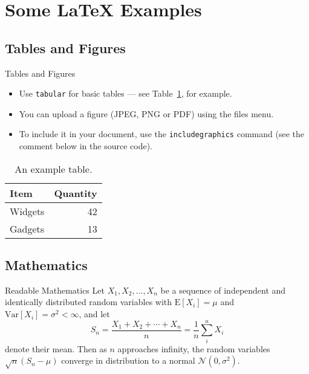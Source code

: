 \documentclass[10pt]{beamer}
\begin{document}
\section{Some \LaTeX{} Examples}

\subsection{Tables and Figures}
\begin{frame}{Tables and Figures}
  \begin{itemize}
    \item Use \texttt{tabular} for basic tables --- see Table~\ref{tab:widgets}, for example.
    \item You can upload a figure (JPEG, PNG or PDF) using the files menu.
    \item To include it in your document, use the \texttt{includegraphics} command (see the comment below in the source code).
  \end{itemize}


  \begin{table}
    \centering
    \begin{tabular}{l|r}
    Item & Quantity \\\hline
    Widgets & 42 \\
    Gadgets & 13
    \end{tabular}
    \caption{\label{tab:widgets}An example table.}
  \end{table}
\end{frame}

\subsection{Mathematics}
\begin{frame}{Readable Mathematics}
  Let $X_1, X_2, \ldots, X_n$ be a sequence of independent and identically distributed random variables with $\text{E}[X_i] = \mu$ and $\text{Var}[X_i] = \sigma^2 < \infty$, and let
  $$S_n = \frac{X_1 + X_2 + \cdots + X_n}{n}
        = \frac{1}{n}\sum_{i}^{n} X_i$$
  denote their mean. Then as $n$ approaches infinity, the random variables $\sqrt{n}(S_n - \mu)$ converge in distribution to a normal $\mathcal{N}(0, \sigma^2)$.
\end{frame}
\end{document}
